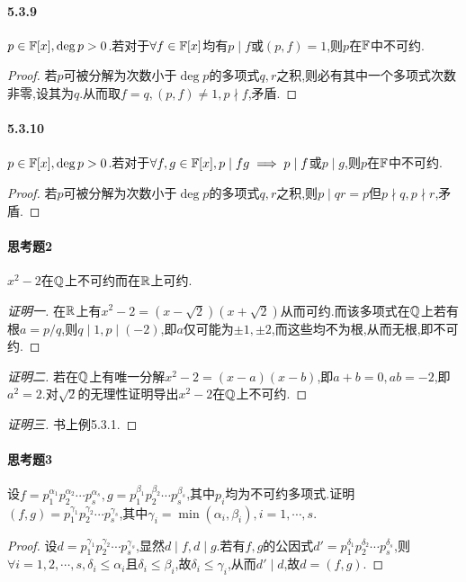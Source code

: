 \documentclass[11pt]{article}
\begin{document}
\paragraph{5.3.9}$p\in \mathbb{F}[x], \deg p>0$.若对于$\forall f\in \mathbb{F}[x]$均有$p\mid f$或$(p,f)=1$,则$p$在$\mathbb{F}$中不可约.
\begin{proof}
    若$p$可被分解为次数小于$\deg p$的多项式$q,r$之积,则必有其中一个多项式次数非零,设其为$q$.从而取$f=q, (p,f)\neq 1, p\nmid f$,矛盾.
\end{proof}
\paragraph{5.3.10}$p\in \mathbb{F}[x], \deg p>0$.若对于$\forall f,g\in \mathbb{F}[x], p\mid fg\implies p\mid f$或$p\mid g$,则$p$在$\mathbb{F}$中不可约.
\begin{proof}
    若$p$可被分解为次数小于$\deg p$的多项式$q,r$之积,则$p\mid qr=p$但$p\nmid q, p\nmid r$,矛盾.
\end{proof}

\paragraph{思考题2}$x^2-2$在$\mathbb{Q}$上不可约而在$\mathbb{R}$上可约.
\begin{proof}[证明一]
    在$\mathbb{R}$上有$x^2-2=(x-\sqrt{2})(x+\sqrt{2})$从而可约.而该多项式在$\mathbb{Q}$上若有根$a=p/q$,则$q\mid 1,p\mid (-2)$,即$a$仅可能为$\pm 1, \pm 2$,而这些均不为根,从而无根,即不可约.
\end{proof}
\begin{proof}[证明二]
    若在$\mathbb{Q}$上有唯一分解$x^2-2=(x-a)(x-b)$,即$a+b=0, ab=-2$,即$a^2=2$.对$\sqrt{2}$的无理性证明导出$x^2-2$在$\mathbb{Q}$上不可约.
\end{proof}
\begin{proof}[证明三]
    书上例5.3.1.
\end{proof}

\paragraph{思考题3}设$f=p_1^{\alpha_1}p_2^{\alpha_2}\cdots p_s^{\alpha_s}, g=p_1^{\beta_1}p_2^{\beta_2}\cdots p_s^{\beta_s}$,其中$p_i$均为不可约多项式.证明$(f,g)=p_1^{\gamma_1}p_2^{\gamma_2}\cdots p_s^{\gamma_s}$,其中$\gamma_i=\min(\alpha_i,\beta_i), i=1,\cdots,s$.

\begin{proof}
    设$d=p_1^{\gamma_1}p_2^{\gamma_2}\cdots p_s^{\gamma_s}$,显然$d\mid f, d\mid g$.若有$f,g$的公因式$d'=p_1^{\delta_1}p_2^{\delta_2}\cdots p_s^{\delta_s}$,则$\forall i=1,2,\cdots,s, \delta_i\leq \alpha_i$且$\delta_i\leq \beta_i$,故$\delta_i\leq \gamma_i$,从而$d'\mid d$,故$d=(f,g)$.
\end{proof}
\end{document}
